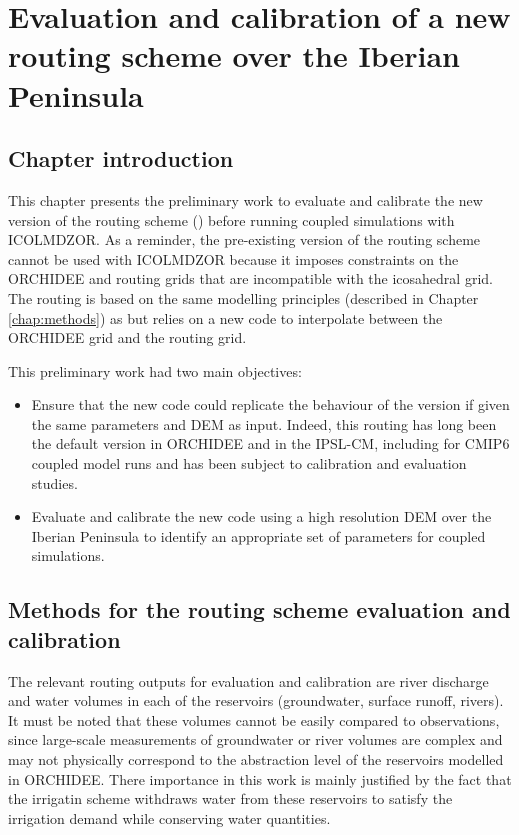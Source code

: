 \chapter{Evaluation and calibration of a new routing scheme over the Iberian Peninsula}
\label{chap:routing}
\minitoc
\pagebreak

\section{Chapter introduction}

This chapter presents the preliminary work to evaluate and calibrate the new version of the routing scheme (\native) before running coupled simulations with ICOLMDZOR. As a reminder, the pre-existing version of the routing scheme \std cannot be used with ICOLMDZOR because it imposes constraints on the ORCHIDEE and routing grids that are incompatible with the icosahedral grid.
The \native routing is based on the same modelling principles (described in Chapter \ref{chap:methods}) as \std but relies on a new code to interpolate between the ORCHIDEE grid and the routing grid. 

This preliminary work had two main objectives:
\begin{itemize}
    \item Ensure that the new code could replicate the behaviour of the \std version if given the same parameters and DEM as input. 
    Indeed, this routing has long been the default version in ORCHIDEE and in the IPSL-CM, including for CMIP6 coupled model runs and has been subject to calibration and evaluation studies. %
    \item Evaluate and calibrate the new code using a high resolution DEM over the Iberian Peninsula to identify an appropriate set of parameters for coupled simulations.
\end{itemize}


\section{Methods for the routing scheme evaluation and calibration}


The relevant routing outputs for evaluation and calibration are river discharge and water volumes in each of the reservoirs (groundwater, surface runoff, rivers). 
It must be noted that these volumes cannot be easily compared to observations, since large-scale measurements of groundwater or river volumes are complex and may not physically correspond to the abstraction level of the reservoirs modelled in ORCHIDEE.
There importance in this work is mainly justified by the fact that the irrigatin scheme withdraws water from these reservoirs to satisfy the irrigation demand while conserving water quantities.


